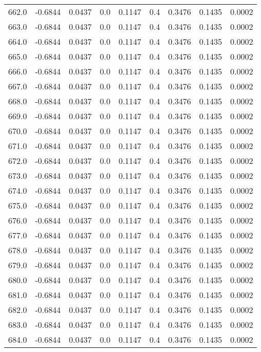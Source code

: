 \begin{longtable}{lrrrrrrrr}
662.0 & -0.6844 & 0.0437 & 0.0 & 0.1147 & 0.4 & 0.3476 & 0.1435 & 0.0002 \\
663.0 & -0.6844 & 0.0437 & 0.0 & 0.1147 & 0.4 & 0.3476 & 0.1435 & 0.0002 \\
664.0 & -0.6844 & 0.0437 & 0.0 & 0.1147 & 0.4 & 0.3476 & 0.1435 & 0.0002 \\
665.0 & -0.6844 & 0.0437 & 0.0 & 0.1147 & 0.4 & 0.3476 & 0.1435 & 0.0002 \\
666.0 & -0.6844 & 0.0437 & 0.0 & 0.1147 & 0.4 & 0.3476 & 0.1435 & 0.0002 \\
667.0 & -0.6844 & 0.0437 & 0.0 & 0.1147 & 0.4 & 0.3476 & 0.1435 & 0.0002 \\
668.0 & -0.6844 & 0.0437 & 0.0 & 0.1147 & 0.4 & 0.3476 & 0.1435 & 0.0002 \\
669.0 & -0.6844 & 0.0437 & 0.0 & 0.1147 & 0.4 & 0.3476 & 0.1435 & 0.0002 \\
670.0 & -0.6844 & 0.0437 & 0.0 & 0.1147 & 0.4 & 0.3476 & 0.1435 & 0.0002 \\
671.0 & -0.6844 & 0.0437 & 0.0 & 0.1147 & 0.4 & 0.3476 & 0.1435 & 0.0002 \\
672.0 & -0.6844 & 0.0437 & 0.0 & 0.1147 & 0.4 & 0.3476 & 0.1435 & 0.0002 \\
673.0 & -0.6844 & 0.0437 & 0.0 & 0.1147 & 0.4 & 0.3476 & 0.1435 & 0.0002 \\
674.0 & -0.6844 & 0.0437 & 0.0 & 0.1147 & 0.4 & 0.3476 & 0.1435 & 0.0002 \\
675.0 & -0.6844 & 0.0437 & 0.0 & 0.1147 & 0.4 & 0.3476 & 0.1435 & 0.0002 \\
676.0 & -0.6844 & 0.0437 & 0.0 & 0.1147 & 0.4 & 0.3476 & 0.1435 & 0.0002 \\
677.0 & -0.6844 & 0.0437 & 0.0 & 0.1147 & 0.4 & 0.3476 & 0.1435 & 0.0002 \\
678.0 & -0.6844 & 0.0437 & 0.0 & 0.1147 & 0.4 & 0.3476 & 0.1435 & 0.0002 \\
679.0 & -0.6844 & 0.0437 & 0.0 & 0.1147 & 0.4 & 0.3476 & 0.1435 & 0.0002 \\
680.0 & -0.6844 & 0.0437 & 0.0 & 0.1147 & 0.4 & 0.3476 & 0.1435 & 0.0002 \\
681.0 & -0.6844 & 0.0437 & 0.0 & 0.1147 & 0.4 & 0.3476 & 0.1435 & 0.0002 \\
682.0 & -0.6844 & 0.0437 & 0.0 & 0.1147 & 0.4 & 0.3476 & 0.1435 & 0.0002 \\
683.0 & -0.6844 & 0.0437 & 0.0 & 0.1147 & 0.4 & 0.3476 & 0.1435 & 0.0002 \\
684.0 & -0.6844 & 0.0437 & 0.0 & 0.1147 & 0.4 & 0.3476 & 0.1435 & 0.0002 \\

\end{longtable}
